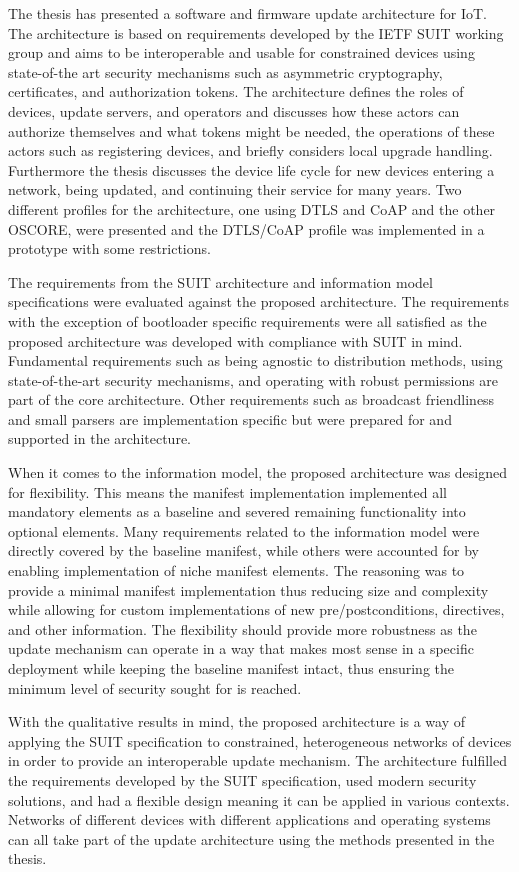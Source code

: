 \documentclass[0-thesis.tex]{subfiles}
\begin{document}
The thesis has presented a software and firmware update architecture for IoT. The
architecture is based on requirements developed by the IETF SUIT working group and aims to
be interoperable and usable for constrained devices using state-of-the art security
mechanisms such as asymmetric cryptography, certificates, and authorization tokens. The
architecture defines the roles of devices, update servers, and operators and discusses how
these actors can authorize themselves and what tokens might be needed, the operations of
these actors such as registering devices, and briefly considers local upgrade handling.
Furthermore the thesis discusses the device life cycle for new devices entering a network,
being updated, and continuing their service for many years. Two different profiles for the
architecture, one using DTLS and CoAP and the other OSCORE, were presented and the
DTLS/CoAP profile was implemented in a prototype with some restrictions.

The requirements from the SUIT architecture and information model specifications were
evaluated against the proposed architecture. The requirements with the exception of
bootloader specific requirements were all satisfied as the proposed architecture was
developed with compliance with SUIT in mind. Fundamental requirements such as being
agnostic to distribution methods, using state-of-the-art security mechanisms, and
operating with robust permissions are part of the core architecture. Other requirements
such as broadcast friendliness and small parsers are implementation specific but were
prepared for and supported in the architecture.

When it comes to the information model, the proposed architecture was designed for
flexibility. This means the manifest implementation implemented all mandatory elements as
a baseline and severed remaining functionality into optional elements. Many requirements
related to the information model were directly covered by the baseline manifest, while
others were accounted for by enabling implementation of niche manifest elements. The
reasoning was to provide a minimal manifest implementation thus reducing size and
complexity while allowing for custom implementations of new pre/postconditions,
directives, and other information. The flexibility should provide more robustness as the
update mechanism can operate in a way that makes most sense in a specific deployment while
keeping the baseline manifest intact, thus ensuring the minimum level of security sought
for is reached. 

With the qualitative results in mind, the proposed architecture is a way of applying the
SUIT specification to constrained, heterogeneous networks of devices in order to provide
an interoperable update mechanism. The architecture fulfilled the requirements developed
by the SUIT specification, used modern security solutions, and had a flexible design
meaning it can be applied in various contexts. Networks of different devices with
different applications and operating systems can all take part of the update architecture
using the methods presented in the thesis.
\end{document}
